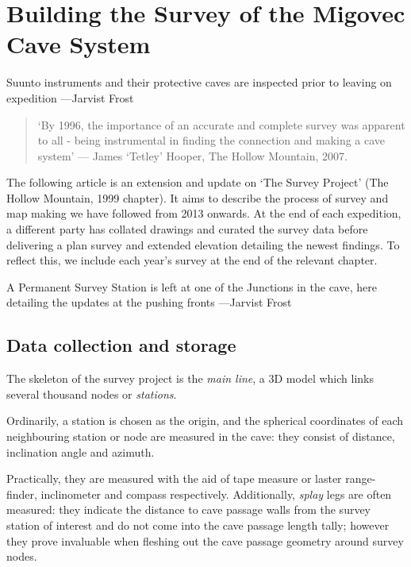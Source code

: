 \chapter{Building the Survey of the Migovec Cave System}
\begin{marginfigure}
\checkoddpage \ifoddpage \forcerectofloat \else \forceversofloat \fi
\centering
 \caption{Suunto instruments and their protective caves are inspected prior to leaving on expedition ---Jarvist Frost}
 \label{compass}
\end{marginfigure}

\begin{quote}
`By 1996, the importance of an accurate and complete survey was apparent to all - being instrumental  in finding the connection and making a cave system' --- James `Tetley' Hooper, The Hollow Mountain, 2007. 
\end{quote}

The following article is an extension and update  on `The Survey Project' (The Hollow Mountain, 1999 chapter). It aims to describe the process of survey and map making we have followed from 2013 onwards. At the end of each expedition, a different party has collated drawings and curated the survey data before delivering a plan survey and extended elevation detailing the newest findings. To reflect this, we include each year's survey at the end of the relevant chapter.

\begin{marginfigure}
\checkoddpage \ifoddpage \forcerectofloat \else \forceversofloat \fi
\centering
 \caption{A Permanent Survey Station is left at one of the Junctions in the cave, here detailing the updates at the pushing fronts ---Jarvist Frost}
 \label{fig:PSS}
\end{marginfigure}


\section{Data collection and storage}
The skeleton of the survey project is the \emph{main line}, a 3D model which links several thousand nodes or \emph{stations}. 

Ordinarily, a station is chosen as the origin, and the spherical coordinates of each neighbouring station or node are measured in the cave: they consist of distance, inclination angle and azimuth. 

Practically, they are measured with the aid of tape measure or laster range-finder, inclinometer and compass respectively. Additionally, \emph{splay} legs are often measured: they indicate the distance to cave passage walls from the survey station of interest and do not come into the cave passage length tally; however they prove invaluable when fleshing out the cave passage geometry around survey nodes.

